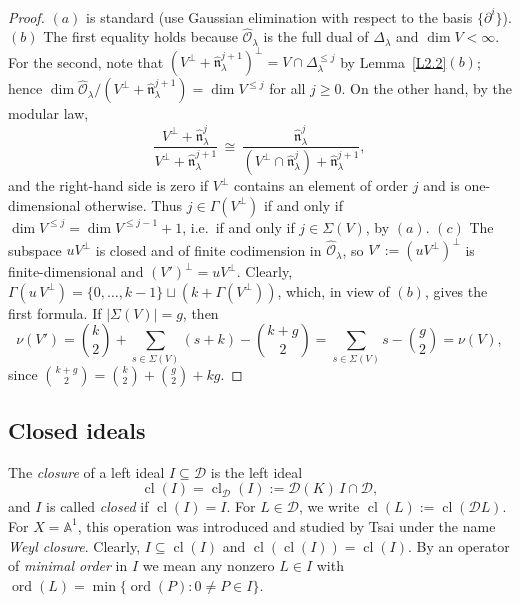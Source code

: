 \documentclass[11pt,reqno]{amsart}
\theoremstyle{plain}
\theoremstyle{definition}
\theoremstyle{remark}
\numberwithin{equation}{section}
\newcommand{\cD}{\mathcal{D}}
\newcommand{\cO}{\mathcal{O}}
\newcommand{\A}{\mathbb{A}}
\newcommand{\del}{\partial}
\newcommand{\fn}{\mathfrak{n}}
\newcommand{\hO}{\widehat{\cO}}
\newcommand{\hn}{\widehat{\fn}}
\newcommand{\Dl}{\Delta_\lambda}
\DeclareMathOperator{\cl}{cl}
\DeclareMathOperator{\ord}{ord}
\begin{document}
\begin{proof}
$(a)$ is standard (use Gaussian elimination with respect to the basis $\{\del^i\}$). $(b)$ The
first equality holds because $\hO_\lambda$ is the full dual of $\Dl$ and $\dim V < \infty$. For the
second, note that $(V^\perp + \hn_\lambda^{j+1})^\perp = V \cap \Dl^{\le j}$ by
Lemma~\ref{L2.2}$(b)$; hence $\dim \hO_\lambda/(V^\perp + \hn^{j+1}_\lambda) = \dim V^{\le j}$
for all $j \ge 0$. On the other hand, by the modular law,
\[
  \frac{V^\perp + \hn_\lambda^{j}}{V^\perp + \hn_\lambda^{j+1}} \, \cong \,
  \frac{\hn^j_\lambda}{(V^\perp \cap \hn^j_\lambda) + \hn^{j+1}_\lambda} ,
\]
and the right-hand side is zero if $V^\perp$ contains an element of order $j$ and is
one-dimensional otherwise. Thus $j \in \Gamma(V^\perp)$ if and only if $\dim V^{\le j} = \dim
V^{\le j-1} + 1$, i.e.\ if and only if $j \in \Sigma(V)$, by $(a)$. $(c)$ The subspace
$u V^\perp$ is closed and of finite codimension in $\hO_\lambda$, so $V' := (u V^\perp)^\perp$ is
finite-dimensional and $(V')^\perp = u V^\perp$. Clearly,
$\Gamma(u\, V^\perp) = \{0, \ldots, k-1\} \sqcup (k + \Gamma(V^\perp))$, which, in view of $(b)$,
gives the first formula. If $|\Sigma(V)| = g$, then
\[
  \nu(V') = \binom{k}{2} + \sum_{s \in \Sigma(V)} (s + k) - \binom{k+g}{2} =
  \sum_{s \in \Sigma(V)} s - \binom{g}{2} = \nu(V) ,
\]
since $\binom{k+g}{2} = \binom{k}{2} + \binom{g}{2} + k g$.
\end{proof}

\subsection{Closed ideals}
\label{S2.3}
The \emph{closure} of a left ideal $I \subseteq \cD$ is the left ideal
\begin{equation}
\label{E26}
  \cl(I) = \cl_{\cD}(I) := \cD(K)\, I \cap \cD ,
\end{equation}
and $I$ is called \emph{closed} if $\cl(I) = I$. For $L \in \cD$, we write $\cl(L) := \cl(\cD L)$.
For $X = \A^1$, this operation was introduced and studied by Tsai \cite{Tsai} under the name
\emph{Weyl closure}. Clearly, $I \subseteq \cl(I)$ and $\cl(\cl(I)) = \cl(I)$. By an operator of
\emph{minimal order} in $I$ we mean any nonzero $L \in I$ with $\ord(L) = \min\{\ord(P) : 0 \ne
P \in I\}$.
\end{document}
